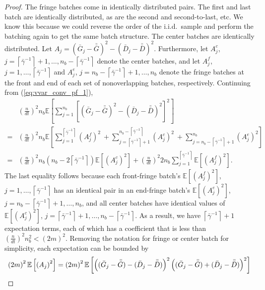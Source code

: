 \documentclass[12pt]{article}
\newcommand{\e}[1]{\mathbb{E} \left[ #1 \right]
}
\newcommand{\gammab}{\bar{\gamma}}
\newcommand{\gb}{\bar{G}}
\newcommand{\gbb}{\bar{\gb}}
\newcommand{\db}{\bar{D}}
\newcommand{\dbb}{\bar{\db}}
\begin{document}
\begin{proof}
	The fringe batches come in identically distributed pairs.  
        The first and last batch are identically distributed, as are the second and second-to-last, etc.  
        We know this because we could reverse the order of the i.i.d.\ sample and perform the batching again to get the same batch structure.  
		  The center batches are identically distributed.  
        Let $A_j = (\gb_j - \gbb)^2 - (\db_j - \dbb)^2$.
		  Furthermore, let $A_j^c$, $j=\left\lceil \gammab^{-1} \right\rceil+1, \ldots, n_b - \left\lceil \gammab^{-1} \right\rceil$ denote the center batches, and let $A_j^f$, $j=1,\ldots,\left\lceil \gammab^{-1} \right\rceil$ and $A_j^e$, $j=n_b - \left\lceil \gammab^{-1} \right\rceil+1,\ldots,n_b$ denote the fringe batches at the front and end of each set of nonoverlapping batches, respectively.  
		  Continuing from (\ref{eq:vvar_conv_pf_1}),
	\begin{align*}
		& \left( \frac{n}{dt} \right)^2 n_b \e{ \sum_{j=1}^{n_b} \left[ (\gb_j - \gbb)^2 - (\db_j - \dbb)^2 \right]^2 } \\
		 =  & \left( \frac{n}{dt} \right)^2 n_b \e{\sum_{j=1}^{\left\lceil \gammab^{-1} \right\rceil} \left( A_j^f \right)^2 \
		 + \sum_{j=\left\lceil \gammab^{-1} \right\rceil+1}^{n_b-\left\lceil \gammab^{-1} \right\rceil} \left( A_j^c \right)^2 \
		 + \sum_{j=n_b-\left\lceil \gammab^{-1} \right\rceil+1}^{n_b} \left( A_j^e \right)^2 
		} \\
		 = & \left( \frac{n}{dt} \right)^2 n_b \left(n_b - 2\left\lceil \gammab^{-1} \right\rceil \right) \e{ \left( A_j^c \right)^2 }
		+ \left( \frac{n}{dt} \right)^2  2 n_b \sum_{j=1}^{\left\lceil \gammab^{-1} \right\rceil} \e{ \left( A_j^f \right)^2 }.
	\end{align*}	
	The last equality follows because each front-fringe batch's $\e{(A_j^f)^2}$, $j=1,\ldots,\left\lceil \gammab^{-1} \right\rceil$  has an identical pair in an end-fringe batch's $\e{(A_j^e)^2}$, $j=n_b - \left\lceil \gammab^{-1} \right\rceil+1,\ldots,n_b$, and all center batches have identical values of $\e{(A_j^c)^2}$, $j=\left\lceil \gammab^{-1} \right\rceil+1, \ldots, n_b - \left\lceil \gammab^{-1} \right\rceil$.  
	As a result, we have $\left\lceil \gammab^{-1} \right\rceil + 1$ expectation terms, each of which has a coefficient that is less than $\left(\frac{n}{dt}\right)^2n_b^2 < (2m)^2$.  
        Removing the notation for fringe or center batch for simplicity, each expectation can be bounded by
	\begin{align}
		\left( 2m \right)^2 \e{ \left( A_j \right)^2 } & = \left( 2m \right)^2 \e{ \left((\gb_j - \gbb) - (\db_j - \dbb)\right)^2 \left((\gb_j - \gbb) + (\db_j - \dbb)\right)^2 } \notag \\

\end{align}
\end{proof}
\end{document}
